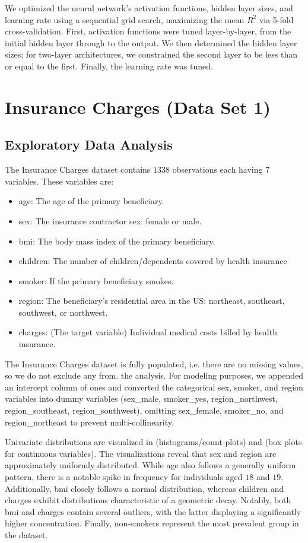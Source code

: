 \documentclass{article}
\begin{document}
We optimized the neural network's activation functions, hidden layer sizes, and learning rate using a sequential grid search, maximizing the mean $R^2$ via 5-fold cross-validation. First, activation functions were tuned layer-by-layer, from the initial hidden layer through to the output. We then determined the hidden layer sizes; for two-layer architectures, we constrained the second layer to be less than or equal to the first. Finally, the learning rate was tuned.

\section{Insurance Charges (Data Set 1)}\label{Insurance Charges}

\subsection{Exploratory Data Analysis}

The Insurance Charges dataset contains $1338$ observations each having $7$ variables. These variables are:
\begin{itemize}
	\item age: The age of the primary beneficiary.
	\item sex: The insurance contractor sex: female or male.
	\item bmi: The body mass index of the primary beneficiary.
	\item children: The number of children/dependents covered by health insurance
	\item smoker: If the primary beneficiary smokes.
	\item region: The beneficiary's residential area in the US: northeast, southeast, southwest, or northwest.
	\item charges: (The target variable) Individual medical costs billed by health insurance.
\end{itemize}

The Insurance Charges dataset is fully populated, i.e. there are no missing values, so we do not exclude any from. the analysis. For modeling purposes, we appended an intercept column of ones and converted the categorical sex, smoker, and region variables into dummy variables (sex\_male, smoker\_yes, region\_northwest, region\_southeast, region\_southwest), omitting sex\_female, smoker\_no, and region\_northeast to prevent multi-collinearity.

Univariate distributions are visualized in  (histograms/count-plots) and  (box plots for continuous variables). The visualizations reveal that sex and region are approximately uniformly distributed. While age also follows a generally uniform pattern, there is a notable spike in frequency for individuals aged $18$ and $19$. Additionally, bmi closely follows a normal distribution, whereas children and charges exhibit distributions characteristic of a geometric decay. Notably, both bmi and charges contain several outliers, with the latter displaying a significantly higher concentration. Finally, non-smokers represent the most prevalent group in the dataset.
\end{document}
